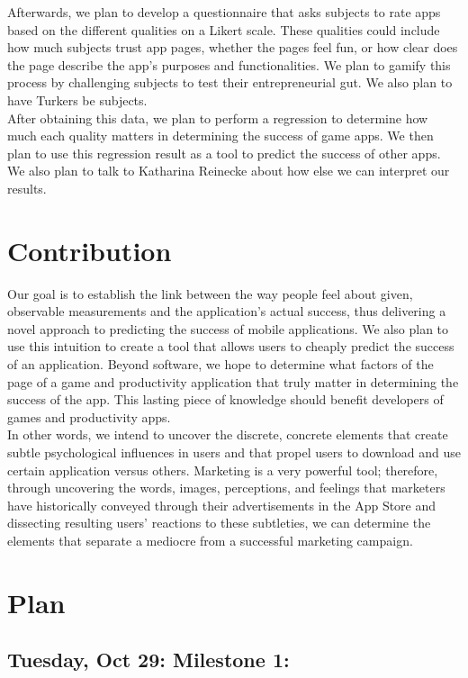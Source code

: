\documentclass{article}
\begin{document}
Afterwards, we plan to develop a questionnaire that asks subjects to rate apps based on the different qualities on a Likert scale. These qualities could include how much subjects trust app pages, whether the pages feel fun, or how clear does the page describe the app’s purposes and functionalities. We plan to gamify this process by challenging subjects to test their entrepreneurial gut. We also plan to have Turkers be subjects. \\

After obtaining this data, we plan to perform a regression to determine how much each quality matters in determining the success of game apps. We then plan to use this regression result as a tool to predict the success of other apps. We also plan to talk to Katharina Reinecke about how else we can interpret our results.

\section{Contribution}

Our goal is to establish the link between the way people feel about given, observable measurements and the application’s actual success, thus delivering a novel approach to predicting the success of mobile applications. We also plan to use this intuition to create a tool that allows users to cheaply predict the success of an application. Beyond software, we hope to determine what factors of the page of a game and productivity application that truly matter in determining the success of the app. This lasting piece of knowledge should benefit developers of games and productivity apps. \\
 
In other words, we intend to uncover the discrete, concrete elements that create subtle psychological influences in users and that propel users to download and use certain  application versus others.  Marketing is a very powerful tool; therefore, through uncovering the words, images, perceptions, and feelings that marketers have historically conveyed through their advertisements in the App Store and dissecting resulting users’ reactions to these subtleties, we can determine the elements that separate a mediocre from a successful marketing campaign. 

\section{Plan}

\subsection{Tuesday, Oct 29: Milestone 1:}
\end{document}
